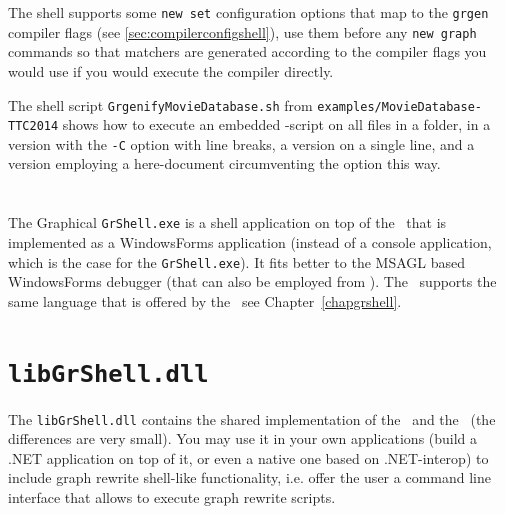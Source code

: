 \begin{note}
The shell supports some \texttt{new set} configuration options that map to the \texttt{grgen} compiler flags (see \ref{sec:compilerconfigshell}), use them before any \texttt{new graph} commands so that matchers are generated according to the compiler flags you would use if you would execute the compiler directly.
\end{note}

\begin{example}
The shell script \texttt{GrgenifyMovieDatabase.sh} from \texttt{examples/MovieDatabase-TTC2014} shows how to execute an embedded \GrShell-script on all files in a folder, in a version with the \texttt{-C} option with line breaks, a version on a single line, and a version employing a here-document circumventing the option this way.
\end{example}

\section{\texttt{}}
\noindent The Graphical \texttt{GrShell.exe} is a shell application on top of the \LibGr\ that is implemented as a WindowsForms application (instead of a console application, which is the case for the \texttt{GrShell.exe}).
It fits better to the MSAGL based WindowsForms debugger (that can also be employed from \GrShell).
The \GGrShell\ supports the same language that is offered by the \GrShell\, see Chapter~\ref{chapgrshell}.

\section{\texttt{libGrShell.dll}}
The \texttt{libGrShell.dll} contains the shared implementation of the \GrShell\ and the \GGrShell\ (the differences are very small).
You may use it in your own applications (build a .NET application on top of it, or even a native one based on .NET-interop) to include graph rewrite shell-like functionality, i.e. offer the user a command line interface that allows to execute graph rewrite scripts.

